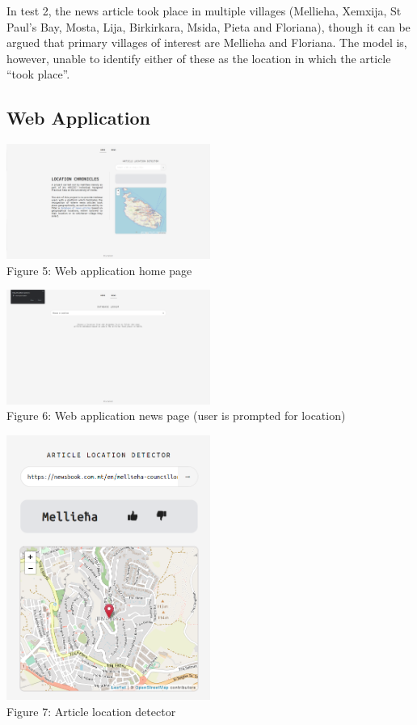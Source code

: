 \documentclass[a4paper, oneside, 11pt]{article}
\begin{document}
\begin{multicols*}{2}
  In test 2, the news article took place in multiple villages (Mellieha, Xemxija, St Paul’s Bay, Mosta, Lija, Birkirkara, Msida, Pieta and Floriana), though it can be argued that primary villages of interest are Mellieha and Floriana. The model is, however, unable to identify either of these as the location in which the article ``took place''.


  \subsection{Web Application}
  \begin{center}
    \includegraphics[width=0.5\textwidth]{./figures/homepage.png} \\
    Figure 5: Web application home page
  \end{center}

  \begin{center}
    \includegraphics[width=0.5\textwidth]{./figures/newspagelocation.png} \\
    Figure 6: Web application news page (user is prompted for location)
  \end{center}

  \begin{center}
    \includegraphics[width=0.5\textwidth]{./figures/locationdetector.png} \\
    Figure 7: Article location detector
  \end{center}


\end{multicols*}
\end{document}
